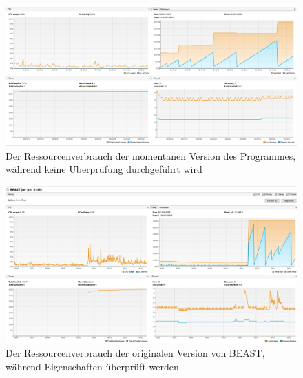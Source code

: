 \documentclass[a4paper]{scrreprt}
\begin{document}
\begin{figure}[ht]
	\centering
  \includegraphics[width=1.0\textheight, 
  height=1.0\textwidth, angle=90]{images/NEW_NO.png} \caption{Der Ressourcenverbrauch der
  momentanen Version des Programmes, während keine Überprüfung durchgeführt wird}
	\label{c}
\end{figure}


\begin{figure}[ht]
	\centering
  \includegraphics[width=1.0\textheight, 
  height=1.0\textwidth, angle=90]{images/OLD_YES.png} \caption{Der Ressourcenverbrauch
 der originalen Version von BEAST, während Eigenschaften überprüft werden}
	\label{b}
\end{figure}
\end{document}
